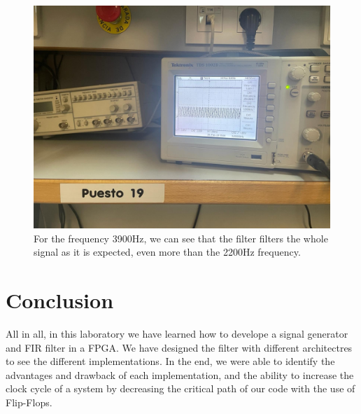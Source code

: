 \documentclass[a4paper, 12pt]{article}
\begin{document}
\begin{figure}[htbp]
\centering
\includegraphics[width=.9\linewidth]{./img/oscilloscope_f_3900.jpg}
\caption{For the frequency 3900Hz, we can see that the filter filters the whole signal as it is expected, even more than the 2200Hz frequency.}
\end{figure}
\section{Conclusion}
\label{sec:org4f5417a}
All in all, in this laboratory we have learned how to develope a signal generator and FIR filter in a FPGA. We have designed the filter with different architectres to see the different implementations. In the end, we were able to identify the advantages and drawback of each implementation, and the ability to increase the clock cycle of a system by decreasing the critical path of our code with the use of Flip-Flops.
\end{document}
